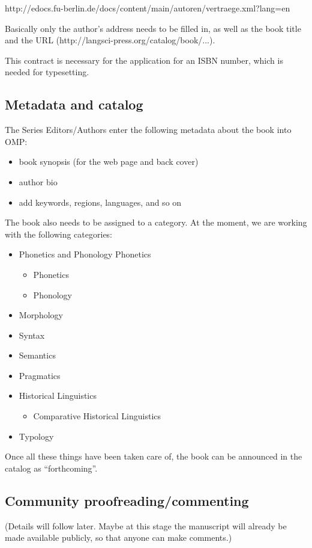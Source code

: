http://edocs.fu-berlin.de/docs/content/main/autoren/vertraege.xml?lang=en

Basically only the author's address needs to be filled in, as well as the book title and the URL (http://langsci-press.org/catalog/book/...).

This contract is necessary for the application for an ISBN number, which is needed for typesetting.

\subsection{Metadata and catalog}

The Series Editors/Authors enter the following metadata about the book into OMP:
\begin{itemize}
\item book synopsis (for the web page and back cover)
\item author bio
\item add keywords, regions, languages, and so on
\end{itemize}
The book also needs to be assigned to a category. At the moment, we are working with the following
categories:
\begin{itemize}
\item Phonetics and Phonology Phonetics
\begin{itemize}
\item Phonetics
\item Phonology
\end{itemize}
\item Morphology
\item Syntax
\item Semantics
\item Pragmatics
\item Historical Linguistics
\begin{itemize}
\item Comparative Historical Linguistics 
\end{itemize}
\item Typology
\end{itemize}
Once all these things have been taken care of, the book can be announced in the catalog as ``forthcoming''.

\subsection{Community proofreading/commenting}

(Details will follow later. Maybe at this stage the manuscript will already be made available publicly, so that anyone can make comments.)

